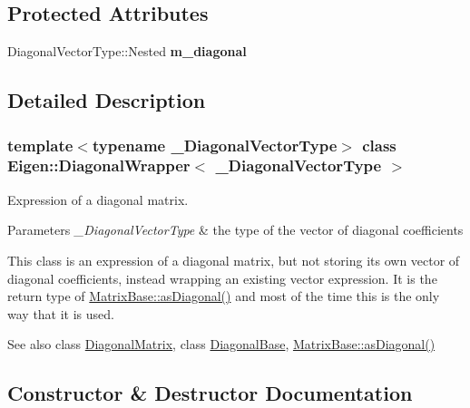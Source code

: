 \subsection*{Protected Attributes}
\begin{DoxyCompactItemize}
\item 
\mbox{\label{class_eigen_1_1_diagonal_wrapper_a42a4abc8dde10e478768b64a283bdb1f}} 
Diagonal\+Vector\+Type\+::\+Nested {\bfseries m\+\_\+diagonal}
\end{DoxyCompactItemize}


\subsection{Detailed Description}
\subsubsection*{template$<$typename \+\_\+\+Diagonal\+Vector\+Type$>$\newline
class Eigen\+::\+Diagonal\+Wrapper$<$ \+\_\+\+Diagonal\+Vector\+Type $>$}

Expression of a diagonal matrix. 


\begin{DoxyParams}{Parameters}
{\em \+\_\+\+Diagonal\+Vector\+Type} & the type of the vector of diagonal coefficients\\
\hline
\end{DoxyParams}
This class is an expression of a diagonal matrix, but not storing its own vector of diagonal coefficients, instead wrapping an existing vector expression. It is the return type of \mbox{\hyperlink{class_eigen_1_1_matrix_base_a14235b62c90f93fe910070b4743782d0}{Matrix\+Base\+::as\+Diagonal()}} and most of the time this is the only way that it is used.

\begin{DoxySeeAlso}{See also}
class \mbox{\hyperlink{class_eigen_1_1_diagonal_matrix}{Diagonal\+Matrix}}, class \mbox{\hyperlink{class_eigen_1_1_diagonal_base}{Diagonal\+Base}}, \mbox{\hyperlink{class_eigen_1_1_matrix_base_a14235b62c90f93fe910070b4743782d0}{Matrix\+Base\+::as\+Diagonal()}} 
\end{DoxySeeAlso}


\subsection{Constructor \& Destructor Documentation}
\mbox{\label{class_eigen_1_1_diagonal_wrapper_a81574f47272fd5e519a19135a306529d}} 
